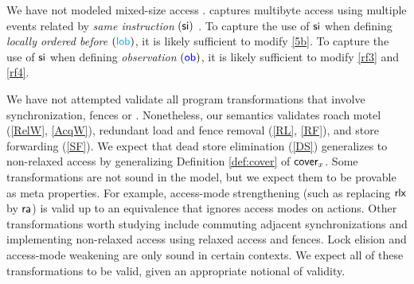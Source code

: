 We have not modeled mixed-size access
\cite{DBLP:conf/popl/FlurSPNMGSBS17,DBLP:conf/pldi/WattPPBDFPG20}.  
\armeight{} captures multibyte access using multiple events related by
\emph{same instruction} $(\mathrel{\mathsf{si}})$ \cite{alglave-git}. To capture the use of
$\mathrel{\mathsf{si}}$ when defining \emph{locally ordered before} $(\rlob)$, it is likely
sufficient to modify \ref{5b}.  To capture the use of $\mathrel{\mathsf{si}}$ when defining
\emph{observation} $(\mathrel{\textcolor{blue}{\mathsf{ob}}})$, it is likely sufficient to modify \ref{rf3} and
\ref{rf4}.

We have not attempted validate all program transformations that involve
synchronization, fences or \RMWs{}
\cite{DBLP:conf/popl/VafeiadisBCMN15,DBLP:phd/hal/Morisset17}.  Nonetheless,
our semantics validates roach motel (\ref{RelW}, \ref{AcqW}), redundant load
and fence removal (\ref{RL}, \ref{RF}), and store forwarding (\ref{SF}).  We
expect that dead store elimination (\ref{DS}) generalizes to non-relaxed
access by generalizing Definition \ref{def:cover} of $\relfilt[]{\aLoc}$.
Some transformations are not sound in the model, but we expect them to be
provable as meta properties.  For example, access-mode strengthening (such as
replacing ${\mathsf{rlx}}$ by ${\mathsf{ra}}$) is valid up to an equivalence that ignores
access modes on actions.  Other transformations worth studying include
commuting adjacent synchronizations and implementing non-relaxed access using
relaxed access and fences.  Lock elision and access-mode weakening are only
sound in certain contexts.  We expect all of these transformations to be
valid, given an appropriate notional of validity.

